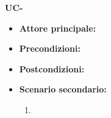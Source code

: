 
\textbf{UC-}
\begin{itemize}
\item \textbf{Attore principale:}
\item \textbf{Precondizioni:}
\item \textbf{Postcondizioni:}
\item \textbf{Scenario secondario:}
\begin{enumerate}
    \item
\end{enumerate}
\end{itemize}
